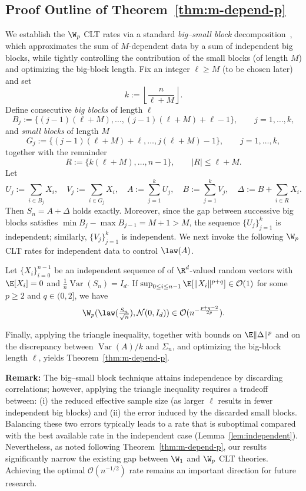 \documentclass[mnsc,nonblindrev]{informs3}
\begin{document}
\subsection{Proof Outline of Theorem~\ref{thm:m-depend-p}}\label{sec:outline-m-depend-p} 
We establish the $\W_p$ CLT rates via a standard \emph{big--small block} decomposition~\citep{Meyn12_book}, which approximates the sum of $M$-dependent data by a sum of independent
big blocks, while tightly controlling the contribution of the small blocks (of length $M$) and
optimizing the big-block length.
  Fix an integer $\ell\ge M$ (to be chosen later) and set
\[
k:=\left\lfloor\frac{n}{\ell+M}\right\rfloor.
\]
Define consecutive \emph{big blocks} of length $\ell$
\[
B_j:=\{(j-1)(\ell+M),\dots,(j-1)(\ell+M)+\ell-1\},\qquad j=1,\dots,k,
\]
and \emph{small blocks} of length $M$
\[
G_j:=\{(j-1)(\ell+M)+\ell,\dots,j(\ell+M)-1\},\qquad j=1,\dots,k,
\]
together with the remainder\[
R:=\{k(\ell+M),\dots,n-1\},
\qquad |R|\le \ell+M.
\]
Let
\[
U_j:=\sum_{i\in B_j}X_i,\quad V_j:=\sum_{i\in G_j}X_i,\quad
A:=\sum_{j=1}^k U_j,\quad B:=\sum_{j=1}^k V_j,\quad \Delta:=B+\sum_{i\in R}X_i.
\]
Then $S_n=A+\Delta$ holds exactly. Moreover, since the gap between successive big
blocks satisfies $\min B_j-\max B_{j-1}=M+1>M$, the sequence $\{U_j\}_{j=1}^k$ is
independent; similarly, $\{V_j\}_{j=1}^k$ is independent. We next invoke the following $\W_p$ CLT rates for independent
data to control $\law(A)$.
\begin{lemma}\label{lem:independent}
Let $\{X_i\}_{i=0}^{n-1}$ be an independent sequence of of $\R^d$-valued random vectors with $\E[X_i]=0$ and $\frac{1}{n}\operatorname{Var}(S_n) = I_d.$ If $\sup_{0 \leq i \leq n-1}\E[\|X_i\|^{p+q}] \in \mathcal O(1) $ for some $p \geq 2$ and $q \in (0,2]$, we have
    \begin{align*}
       \W_p(\law(\tfrac{S_n}{\sqrt{n}}), \mathcal{N}(0, I_d)) \in \mathcal{O}(n^{-\frac{p+q-2}{2p}})  .
    \end{align*}
    \end{lemma}
Finally, applying the triangle inequality, together with bounds on $\E\|\Delta\|^{p}$ and on the
discrepancy between $\operatorname{Var}(A)/k$ and $\Sigma_n$, and optimizing the big-block length $\ell$,
yields Theorem~\ref{thm:m-depend-p}.

\noindent\textbf{Remark:} The big--small block technique attains independence by discarding correlations; however, applying the triangle
inequality requires a tradeoff between: (i) the reduced effective sample size (as larger
$\ell$ results in fewer independent big blocks) and (ii) the error induced by the discarded small blocks. Balancing these two
errors typically leads to a rate that is suboptimal compared with the best available rate in the
independent case (Lemma~\ref{lem:independent}). Nevertheless, as noted following Theorem~\ref{thm:m-depend-p}, our results significantly narrow the existing gap between $\W_1$ and $\W_p$ CLT theories. Achieving the optimal $\mathcal{O}(n^{-1/2})$ rate remains an important direction for future research.
\end{document}
